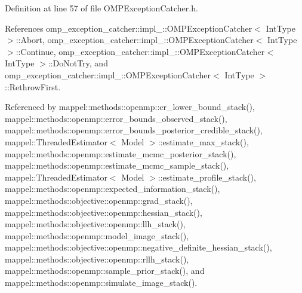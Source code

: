 Definition at line 57 of file O\+M\+P\+Exception\+Catcher.\+h.



References omp\+\_\+exception\+\_\+catcher\+::impl\+\_\+\+::\+O\+M\+P\+Exception\+Catcher$<$ Int\+Type $>$\+::\+Abort, omp\+\_\+exception\+\_\+catcher\+::impl\+\_\+\+::\+O\+M\+P\+Exception\+Catcher$<$ Int\+Type $>$\+::\+Continue, omp\+\_\+exception\+\_\+catcher\+::impl\+\_\+\+::\+O\+M\+P\+Exception\+Catcher$<$ Int\+Type $>$\+::\+Do\+Not\+Try, and omp\+\_\+exception\+\_\+catcher\+::impl\+\_\+\+::\+O\+M\+P\+Exception\+Catcher$<$ Int\+Type $>$\+::\+Rethrow\+First.



Referenced by mappel\+::methods\+::openmp\+::cr\+\_\+lower\+\_\+bound\+\_\+stack(), mappel\+::methods\+::openmp\+::error\+\_\+bounds\+\_\+observed\+\_\+stack(), mappel\+::methods\+::openmp\+::error\+\_\+bounds\+\_\+posterior\+\_\+credible\+\_\+stack(), mappel\+::\+Threaded\+Estimator$<$ Model $>$\+::estimate\+\_\+max\+\_\+stack(), mappel\+::methods\+::openmp\+::estimate\+\_\+mcmc\+\_\+posterior\+\_\+stack(), mappel\+::methods\+::openmp\+::estimate\+\_\+mcmc\+\_\+sample\+\_\+stack(), mappel\+::\+Threaded\+Estimator$<$ Model $>$\+::estimate\+\_\+profile\+\_\+stack(), mappel\+::methods\+::openmp\+::expected\+\_\+information\+\_\+stack(), mappel\+::methods\+::objective\+::openmp\+::grad\+\_\+stack(), mappel\+::methods\+::objective\+::openmp\+::hessian\+\_\+stack(), mappel\+::methods\+::objective\+::openmp\+::llh\+\_\+stack(), mappel\+::methods\+::openmp\+::model\+\_\+image\+\_\+stack(), mappel\+::methods\+::objective\+::openmp\+::negative\+\_\+definite\+\_\+hessian\+\_\+stack(), mappel\+::methods\+::objective\+::openmp\+::rllh\+\_\+stack(), mappel\+::methods\+::openmp\+::sample\+\_\+prior\+\_\+stack(), and mappel\+::methods\+::openmp\+::simulate\+\_\+image\+\_\+stack().

